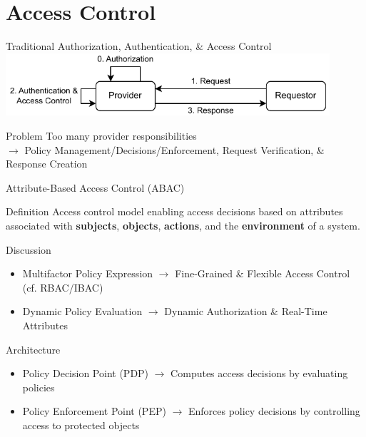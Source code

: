 \documentclass[en]{sdqbeamer}
\begin{document}
\section{Access Control}
\begin{frame}{Traditional Authorization, Authentication, \& Access Control}
    \centering
	\includegraphics[width=0.9\textwidth]{./figures/access_control_request_traditional.drawio.pdf}
    \begin{redblock}{Problem}
        Too many provider responsibilities
        \\$\rightarrow$ Policy Management/Decisions/Enforcement, Request Verification, \& Response Creation
    \end{redblock}
\end{frame}
\begin{frame}{Attribute-Based Access Control (ABAC)}
    \begin{greenblock}{Definition \parencite{JTF2020}}
        Access control model enabling access decisions based on attributes associated with \textbf{subjects}, \textbf{objects}, \textbf{actions}, and the \textbf{environment} of a system.
    \end{greenblock}

    \begin{blueblock}{Discussion \parencite{Hu2014}}
        \begin{itemize}
            \item Multifactor Policy Expression $\rightarrow$ Fine-Grained \& Flexible Access Control (cf. RBAC/IBAC)
            \item Dynamic Policy Evaluation $\rightarrow$ Dynamic Authorization \& Real-Time Attributes
        \end{itemize}
    \end{blueblock}

    \begin{grayblock}{Architecture \parencite{Hu2014,Oasis2013}}
        \begin{itemize}
            \item Policy Decision Point (PDP) $\rightarrow$ Computes access decisions by evaluating policies
            \item Policy Enforcement Point (PEP) $\rightarrow$ Enforces policy decisions by controlling access to protected objects
        \end{itemize}
    \end{grayblock}
\end{frame}
\end{document}
